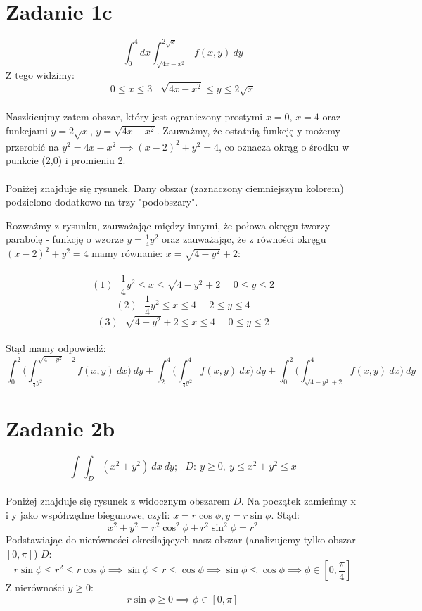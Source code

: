 \documentclass{article}
\begin{document}
\section*{Zadanie 1c}

$$\int_{0}^{4} dx \int_{\sqrt{4x-x^2}}^{2\sqrt{x}} f(x,y) \ dy$$
Z tego widzimy:
$$0 \leq x \leq 3 \ \ \ \ \sqrt{4x-x^2} \leq y \leq 2\sqrt{x}$$ \\
Naszkicujmy zatem obszar, który jest ograniczony prostymi $x = 0$, $x = 4$ oraz funkcjami $y = 2\sqrt{x}$, $y = \sqrt{4x-x^2}$. Zauważmy, że ostatnią funkcję y możemy przerobić na $y^2 = 4x-x^2 \implies (x-2)^2 + y^2 = 4$, co oznacza okrąg o środku w punkcie (2,0) i promieniu 2. \\ \\
Poniżej znajduje się rysunek. Dany obszar (zaznaczony ciemniejszym kolorem) podzielono dodatkowo na trzy "podobszary".

\hfill \break
Rozważmy z rysunku, zauważając między innymi, że połowa okręgu tworzy parabolę - funkcję o wzorze $y = \frac{1}{4}y^2$ oraz zauważając, że z równości okręgu $(x-2)^2 +y^2 = 4$ mamy równanie: $x = \sqrt{4-y^2}+2$: \\ \\
$$(1) \ \ \ \frac{1}{4}y^2 \leq x \leq \sqrt{4-y^2}+2 \ \ \ \ \ \ 0 \leq y \leq 2$$
$$(2) \ \ \ \frac{1}{4}y^2 \leq x \leq 4 \ \ \ \ \ \ 2 \leq y \leq 4$$
$$(3) \ \ \ \sqrt{4-y^2}+2 \leq x \leq 4 \ \ \ \ \ \ 0 \leq y \leq 2$$ \\
Stąd mamy odpowiedź:
$$\int_{0}^{2} \Big( \int_{\frac{1}{4}y^2}^{\sqrt{4-y^2}+2} f(x,y) \ dx \Big)\ dy + \int_{2}^{4} \Big( \int_{\frac{1}{4}y^2}^{4} f(x,y) \ dx \Big)\ dy + \int_{0}^{2} \Big( \int_{\sqrt{4-y^2}+2}^{4} f(x,y) \ dx \Big)\ dy$$


\section*{Zadanie 2b}

$$\int \int_{D} (x^2+y^2) \ dx \ dy; \ \ \ D: \ y \geq 0, \ y \leq x^2+y^2 \leq x$$ \\
Poniżej znajduje się rysunek z widocznym obszarem $D$.
Na początek zamieńmy x i y jako współrzędne biegunowe, czyli: $x = r \cos{\phi}, y = r \sin{\phi}$. Stąd: \\
$$x^2+y^2 = r^2 \cos^2{\phi}+r^2 \sin^2{\phi} = r^2$$
Podstawiając do nierówności określających nasz obszar (analizujemy tylko obszar $[0, \pi]$) $D$:
$$r \sin{\phi} \leq r^2 \leq r \cos{\phi} \implies \sin{\phi} \leq r \leq \cos{\phi} \implies \sin{\phi} \leq \cos{\phi} \implies \phi \in [0, \frac{\pi}{4}]$$
Z nierówności $y \geq 0$:
$$r \sin{\phi} \geq 0 \implies \phi \in [0, \pi]$$ \\ \\
\end{document}
